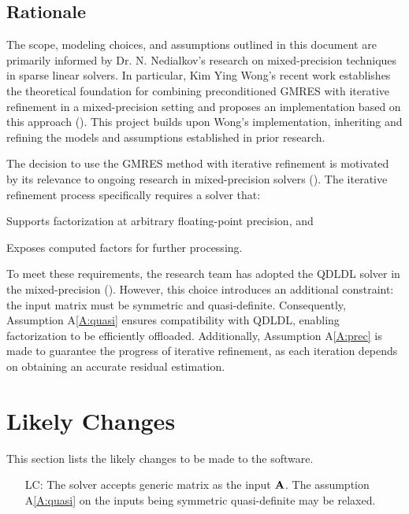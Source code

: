 \documentclass[12pt]{article}
\newcommand{\aref}[1]{A\ref{#1}}
\newcounter{lcnum} %
\begin{document}
\subsection{Rationale}


The scope, modeling choices, and assumptions outlined in this document are
primarily informed by Dr. N. Nedialkov's research on mixed-precision techniques
in sparse linear solvers. In particular, Kim Ying Wong's recent work establishes
the theoretical foundation for combining preconditioned GMRES with iterative
refinement in a mixed-precision setting and proposes an implementation based on
this approach (\cite{wong_exploring_2024}). This project builds upon Wong’s
implementation, inheriting and refining the models and assumptions established
in prior research.

The decision to use the GMRES method with iterative refinement is motivated by
its relevance to ongoing research in mixed-precision solvers
(\cite{bassi_investigating_2022}). The iterative refinement process specifically
requires a solver that:
\begin{enumerate*}[a)]
\item Supports factorization at arbitrary floating-point precision, and
\item Exposes computed factors for further processing.
\end{enumerate*}
To meet these requirements, the research team has adopted the QDLDL solver in
the mixed-precision (\cite{shahrooz_derakhshan_using_2023}). However, this
choice introduces an additional constraint: the input matrix must be symmetric
and quasi-definite. Consequently, Assumption \aref{A:quasi} ensures
compatibility with QDLDL, enabling factorization to be efficiently offloaded.
Additionally, Assumption \aref{A:prec} is made to guarantee the progress of
iterative refinement, as each iteration depends on obtaining an accurate
residual estimation.

\section{Likely Changes}

This section lists the likely changes to be made to the software.

\begin{itemize}
\item[LC\refstepcounter{lcnum}\thelcnum\label{LC:generic}:] The solver accepts
  generic matrix as the input \(\mathbf{A}\). The assumption \aref{A:quasi} on the
  inputs being symmetric quasi-definite may be relaxed.
\end{itemize}
\end{document}
